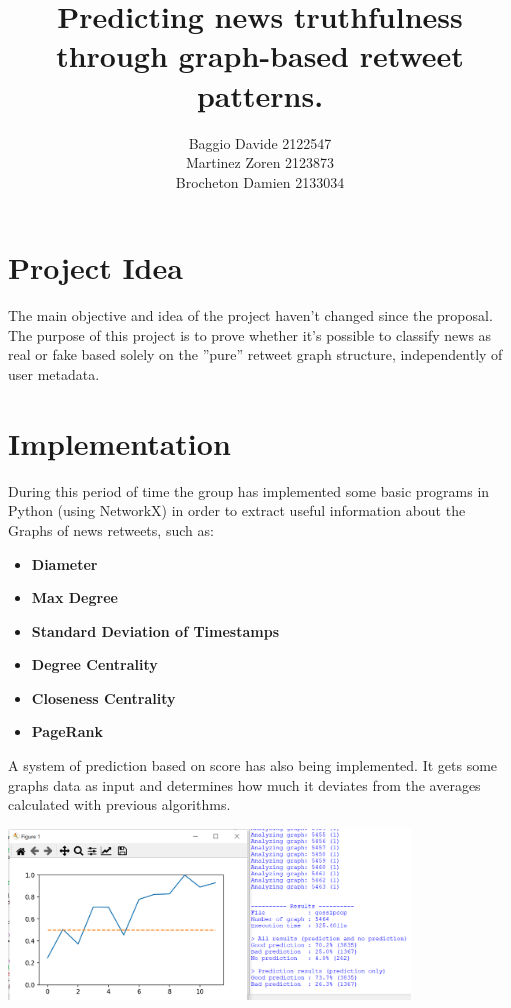 \documentclass[11pt,a4paper]{article}
\title{Predicting news truthfulness through graph-based retweet patterns.}
\author{Baggio Davide 2122547 \\ Martinez Zoren 2123873 \\ Brocheton Damien 2133034}
\date{}
\begin{document}
\maketitle

\section*{Project Idea}

The main objective and idea of the project haven't changed since the proposal. The purpose of this project is to prove whether it’s possible to classify news as real or fake based solely on the ”pure” retweet
graph structure, independently of user metadata.

\section*{Implementation}

During this period of time the group has implemented some basic programs in Python (using NetworkX\cite{networkx}) in order to extract useful information about the Graphs of news retweets, such as:

\begin{itemize}
	\setlength\itemsep{-0.3em}
	\item \textbf{Diameter}
	\item \textbf{Max Degree}
	\item \textbf{Standard Deviation of Timestamps}
	\item \textbf{Degree Centrality}
	\item \textbf{Closeness Centrality}
	\item \textbf{PageRank}
\end{itemize}

A system of prediction based on score has also being implemented. It gets some graphs data as input and determines how much it deviates from the averages calculated with previous algorithms.

	\begin{center}
	  \includegraphics[width=0.8\textwidth]{results_gos}
	\end{center}
\end{document}
